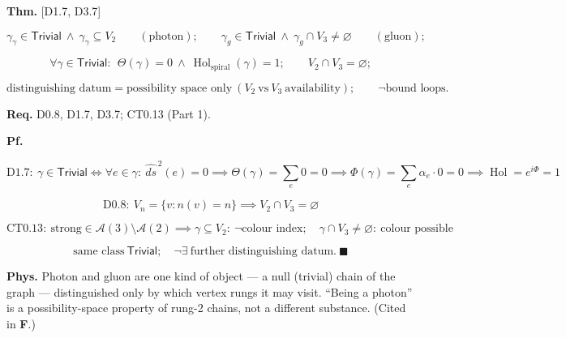 \begin{theorem}\label{tag:EM-5}
\textbf{Thm.} [D1.7, D3.7]

\[
\gamma_{\gamma}\in\mathsf{Trivial}\ \wedge\ \gamma_{\gamma}\subseteq V_2\qquad(\text{photon});\qquad
\gamma_g\in\mathsf{Trivial}\ \wedge\ \gamma_g\cap V_3\ne\varnothing\qquad(\text{gluon});
\]

\[
\forall\gamma\in\mathsf{Trivial}:\ \ \Theta(\gamma)=0\ \wedge\ \operatorname{Hol}_{\mathrm{spiral}}(\gamma)=1;\qquad
V_2\cap V_3=\varnothing;
\]

\[
\text{distinguishing datum}=\text{possibility space only}\ (V_2\ \text{vs}\ V_3\ \text{availability});\qquad\neg\text{bound loops}.
\]

\textbf{Req.} D0.8, D1.7, D3.7; CT0.13 (Part 1).

\textbf{Pf.}

\[
\mathrm{D1.7}:\ \gamma\in\mathsf{Trivial}\iff\forall e\in\gamma:\ \widehat{ds}^{\,2}(e)=0\implies\Theta(\gamma)=\sum_e0=0\implies\Phi(\gamma)=\sum_e\alpha_e\cdot0=0\implies\operatorname{Hol}=e^{i\Phi}=1
\]

\[
\mathrm{D0.8}:\ V_n=\{v:n(v)=n\}\implies V_2\cap V_3=\varnothing
\]

\[
\mathrm{CT0.13}:\ \mathrm{strong}\in\mathcal A(3)\setminus\mathcal A(2)\implies\gamma\subseteq V_2:\ \neg\text{colour index};\quad\gamma\cap V_3\ne\varnothing:\ \text{colour possible}
\]

\[
\text{same class}\ \mathsf{Trivial};\quad\neg\exists\ \text{further distinguishing datum}.\ \blacksquare
\]

\textbf{Phys.} Photon and gluon are one kind of object — a null (trivial) chain of the graph — distinguished only by which vertex rungs it may visit. “Being a photon” is a possibility-space property of rung-2 chains, not a different substance. (Cited in \textbf{F}.)

\end{theorem}

